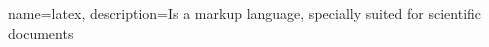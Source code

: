 
{
    name=latex,
    description={Is a markup language, specially suited for scientific documents}
}

